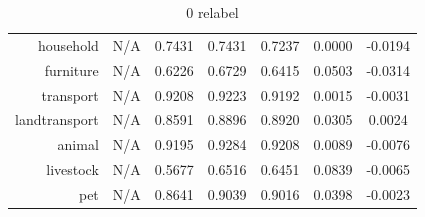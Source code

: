 \documentclass[11pt,a4paper]{article}
\begin{document}
\begin{table}[htbp]
\begin{tabular}{r|c|c|c|c|c|c}
household     & N/A    & 0.7431 & 0.7431 & 0.7237 & 0.0000 & -0.0194\\
furniture     & N/A    & 0.6226 & 0.6729 & 0.6415 & 0.0503 & -0.0314\\
transport     & N/A    & 0.9208 & 0.9223 & 0.9192 & 0.0015 & -0.0031\\
landtransport & N/A    & 0.8591 & 0.8896 & 0.8920 & 0.0305 & 0.0024\\
animal        & N/A    & 0.9195 & 0.9284 & 0.9208 & 0.0089 & -0.0076\\
livestock     & N/A    & 0.5677 & 0.6516 & 0.6451 & 0.0839 & -0.0065\\
pet           & N/A    & 0.8641 & 0.9039 & 0.9016 & 0.0398 & -0.0023
\end{tabular}
\caption{0 relabel}
\label{tab:svm0acc}
\end{table}
\end{document}
